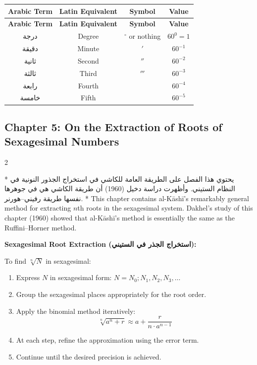 \documentclass[11pt,a4paper]{article}
\newcommand{\ar}[1]{\arabicfont\beginR #1\endR}
\newenvironment{bilingual}{%
  \vspace{0.3em}%
  \begin{paracol}{2}%
}{%
  \end{paracol}%
  \vspace{0.3em}%
}
\newenvironment{mathalgo}{%
  \par\vspace{0.3cm}
  \begin{framed}
  \setlength{\parindent}{0pt}
}{%
  \end{framed}
  \par\vspace{0.3cm}
}
\begin{document}
\begin{longtable}{|c|c|c|c|}
\hline
\textbf{Arabic Term} & \textbf{Latin Equivalent} & \textbf{Symbol} &
\textbf{Value} \\
\hline
\endfirsthead
\hline
\textbf{Arabic Term} & \textbf{Latin Equivalent} & \textbf{Symbol} &
\textbf{Value} \\
\hline
\endhead
\ar{درجة} & Degree & $^\circ$ or nothing & $60^0 = 1$ \\
\hline
\ar{دقيقة} & Minute & $'$ & $60^{-1}$ \\
\hline
\ar{ثانية} & Second & $''$ & $60^{-2}$ \\
\hline
\ar{ثالثة} & Third & $'''$ & $60^{-3}$ \\
\hline
\ar{رابعة} & Fourth & & $60^{-4}$ \\
\hline
\ar{خامسة} & Fifth & & $60^{-5}$ \\
\hline
\end{longtable}

\subsection{Chapter 5: On the Extraction of Roots of Sexagesimal Numbers}

\begin{bilingual}
\switchcolumn[0]*
\ar{يحتوي هذا الفصل على الطريقة العامة للكاشي في استخراج الجذور النونية في النظام الستيني. وأظهرت دراسة دخيل (1960) أن طريقة الكاشي هي في جوهرها نفسها طريقة رفيني--هورنر.}
\switchcolumn[1]*
This chapter contains al-K\=ash\=i's remarkably general method for
extracting $n$th roots in the sexagesimal system. Dakhel's study of
this chapter (1960) showed that al-K\=ash\=i's method is essentially the
same as the Ruffini--Horner method.
\end{bilingual}

\begin{mathalgo}
\textbf{Sexagesimal Root Extraction (\ar{استخراج الجذر في الستيني}):}

To find $\sqrt[n]{N}$ in sexagesimal:
\begin{enumerate}[nosep]
  \item Express $N$ in sexagesimal form: $N = N_0; N_1, N_2, N_3, \ldots$
  \item Group the sexagesimal places appropriately for the root order.
  \item Apply the binomial method iteratively:
    \[
    \sqrt[n]{a^n + r} \approx a + \frac{r}{n \cdot a^{n-1}}
    \]
  \item At each step, refine the approximation using the error term.
  \item Continue until the desired precision is achieved.
\end{enumerate}
\end{mathalgo}
\end{document}
